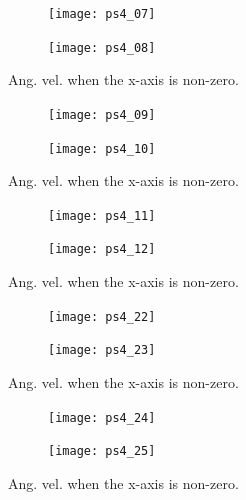 \documentclass[12pt, letterpaper]{article}
\begin{document}
\begin{figure}[H]
	\centering
	\begin{subfigure}[b]{0.49\textwidth}
		\texttt{[image: ps4\_07]}
	\end{subfigure}
	\begin{subfigure}[b]{0.49\textwidth}
		\texttt{[image: ps4\_08]}
	\end{subfigure}
	\caption{Ang. vel. when the x-axis is non-zero.}
	\label{(4:xangvel1)}
\end{figure}


\begin{figure}[H]
	\centering
	\begin{subfigure}[b]{0.49\textwidth}
		\texttt{[image: ps4\_09]}
	\end{subfigure}
	\begin{subfigure}[b]{0.49\textwidth}
		\texttt{[image: ps4\_10]}
	\end{subfigure}
	\caption{Ang. vel. when the x-axis is non-zero.}
	\label{(4:xangvel1)}
\end{figure}


\begin{figure}[H]
	\centering
	\begin{subfigure}[b]{0.49\textwidth}
		\texttt{[image: ps4\_11]}
	\end{subfigure}
	\begin{subfigure}[b]{0.49\textwidth}
		\texttt{[image: ps4\_12]}
	\end{subfigure}
	\caption{Ang. vel. when the x-axis is non-zero.}
	\label{(4:xangvel1)}
\end{figure}



\begin{figure}[H]
	\centering
	\begin{subfigure}[b]{0.49\textwidth}
		\texttt{[image: ps4\_22]}
	\end{subfigure}
	\begin{subfigure}[b]{0.49\textwidth}
		\texttt{[image: ps4\_23]}
	\end{subfigure}
	\caption{Ang. vel. when the x-axis is non-zero.}
	\label{(4:xangvel1)}
\end{figure}

\begin{figure}[H]
	\centering
	\begin{subfigure}[b]{0.49\textwidth}
		\texttt{[image: ps4\_24]}
	\end{subfigure}
	\begin{subfigure}[b]{0.49\textwidth}
		\texttt{[image: ps4\_25]}
	\end{subfigure}
	\caption{Ang. vel. when the x-axis is non-zero.}
	\label{(4:xangvel1)}
\end{figure}
\end{document}
